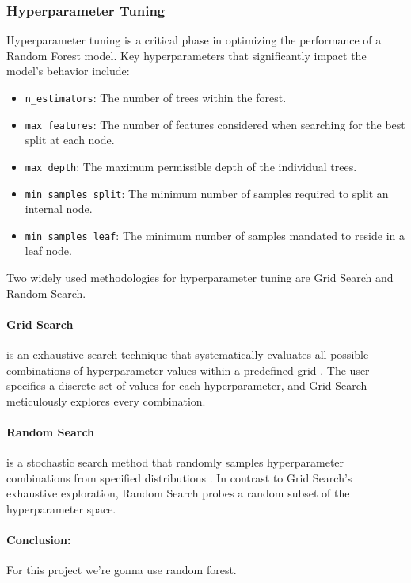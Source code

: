 \subsubsection{Hyperparameter Tuning}

Hyperparameter tuning is a critical phase in optimizing the performance of a Random Forest model.
Key hyperparameters that significantly impact the model's behavior include:

\begin{itemize}
    \item \texttt{n\_estimators}: The number of trees within the forest.
    \item \texttt{max\_features}: The number of features considered when searching for the best split at each node.
    \item \texttt{max\_depth}: The maximum permissible depth of the individual trees.
    \item \texttt{min\_samples\_split}: The minimum number of samples required to split an internal node.
    \item \texttt{min\_samples\_leaf}: The minimum number of samples mandated to reside in a leaf node.
\end{itemize}

Two widely used methodologies for hyperparameter tuning are Grid Search and Random Search.

\paragraph{Grid Search} is an exhaustive search technique that systematically evaluates all possible combinations of hyperparameter values within a predefined grid \cite{bergstra2012random}.
The user specifies a discrete set of values for each hyperparameter, and Grid Search meticulously explores every combination.

\paragraph{Random Search} is a stochastic search method that randomly samples hyperparameter combinations from specified distributions \cite{bergstra2012random}.
In contrast to Grid Search's exhaustive exploration, Random Search probes a random subset of the hyperparameter space.

\paragraph{Conclusion:} For this project we're gonna use random forest.
